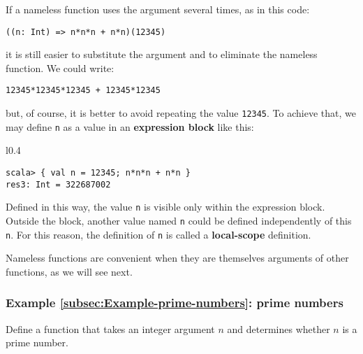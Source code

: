 If a nameless function uses the argument several times, as in this
code:
\begin{lstlisting}
((n: Int) => n*n*n + n*n)(12345)
\end{lstlisting}
it is still easier to substitute the argument and to eliminate the
nameless function. We could write:
\begin{lstlisting}
12345*12345*12345 + 12345*12345
\end{lstlisting}
but, of course, it is better to avoid repeating the value \lstinline!12345!.
To achieve that, we may define \texttt{}\lstinline!n! as a value
in an \textbf{expression block} like this:

\begin{wrapfigure}{l}{0.4\columnwidth}%
\vspace{-0.8\baselineskip}
\begin{lstlisting}
scala> { val n = 12345; n*n*n + n*n }
res3: Int = 322687002
\end{lstlisting}

\vspace{-1.5\baselineskip}
\end{wrapfigure}%

\noindent Defined in this way, the value \lstinline!n! is visible
only within the expression block. Outside the block, another value
named \lstinline!n! could be defined independently of this \lstinline!n!.
For this reason, the definition of \lstinline!n! is called a \textbf{local-scope}
definition.

Nameless functions are convenient when they are themselves arguments
of other functions, as we will see next.

\subsubsection{Example \label{subsec:Example-prime-numbers}\ref{subsec:Example-prime-numbers}:
prime numbers}

Define a function that takes an integer argument $n$ and determines
whether $n$ is a prime number.

